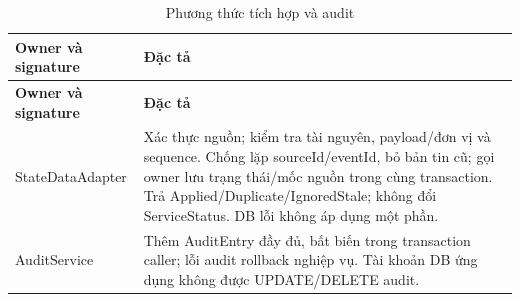 \begin{longtable}{|L{58mm}|L{81mm}|}
\caption{Phương thức tích hợp và audit}\\\hline
\textbf{Owner và signature} & \textbf{Đặc tả}\\\hline
\endfirsthead
\hline\textbf{Owner và signature} & \textbf{Đặc tả}\\\hline\endhead
StateDataAdapter\par{} &
Xác thực nguồn; kiểm tra tài nguyên, payload/đơn vị và sequence. Chống lặp sourceId/eventId, bỏ bản tin cũ; gọi owner lưu trạng thái/mốc nguồn trong cùng transaction. Trả Applied/Duplicate/IgnoredStale; không đổi ServiceStatus. DB lỗi không áp dụng một phần.\\\hline
AuditService\par{} &
Thêm AuditEntry đầy đủ, bất biến trong transaction caller; lỗi audit rollback nghiệp vụ. Tài khoản DB ứng dụng không được UPDATE/DELETE audit.\\\hline
\end{longtable}
